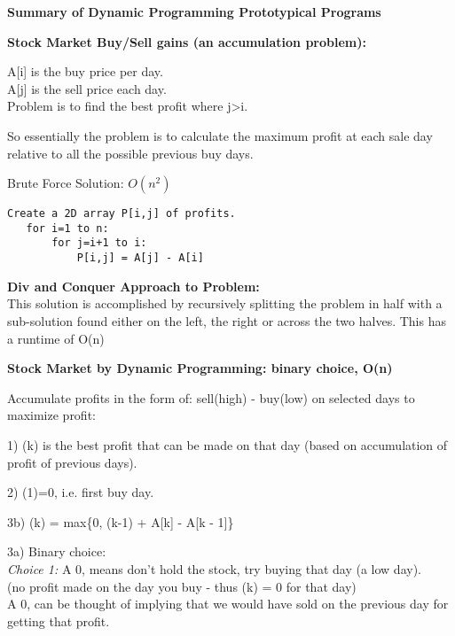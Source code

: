 
{\bf \Large Summary of Dynamic Programming Prototypical Programs}

{\bf Stock Market Buy/Sell gains (an accumulation problem):}

A[i] is the buy price per day. \\
A[j] is the sell price each day. \\
Problem is to find the best profit where j>i.

So essentially the problem is to calculate the maximum profit at each 
sale day relative to all the possible previous buy days.

\newpage
Brute Force Solution: $O(n^2)$


\begin{lstlisting}[label=lst1,mathescape,frame=single,numbers=right]
   Create a 2D array P[i,j] of profits.
   for i=1 to n:  
       for j=i+1 to i:
           P[i,j] = A[j] - A[i] 
\end{lstlisting}
                 
{\bf Div and Conquer Approach to Problem: }\\

This solution is accomplished by recursively splitting the problem 
in half with a sub-solution found either on the left, the right or across 
the two halves.  This has a runtime of O(n)

{\bf Stock Market by Dynamic Programming: binary choice, O(n)}

Accumulate profits in the form of: sell(high) - buy(low) on selected days to maximize profit:

 1)  \opt(k) is the best profit that can be made on that day (based on accumulation 
   of profit of previous days). 

 2)  \opt(1)=0, i.e. first buy day.

 3b) \opt(k) = max\{0, \opt(k-1) + A[k] - A[k - 1]\}

 3a) Binary choice:\\
{\em Choice 1:} A 0, means don't hold the stock, try buying that day (a low day).\\
(no profit made on the day you buy - thus \opt(k) = 0 for that day)\\
A 0, can be thought of implying that we would have sold on the previous day for 
getting that profit.

